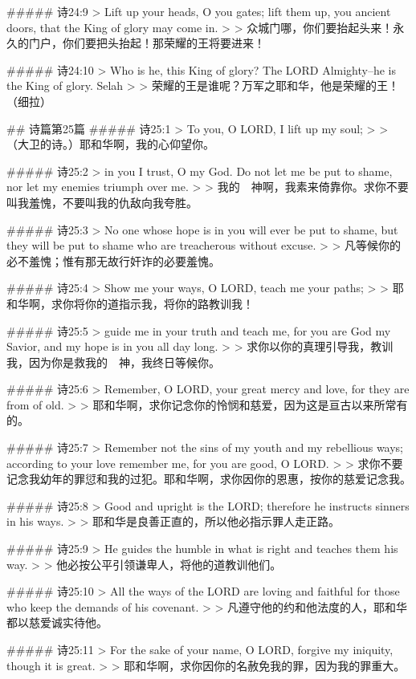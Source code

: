 ##### 诗24:9
> Lift up your heads, O you gates; lift them up, you ancient doors, that the King of glory may come in.
>
> 众城门哪，你们要抬起头来！永久的门户，你们要把头抬起！那荣耀的王将要进来！


##### 诗24:10
> Who is he, this King of glory? The LORD Almighty--he is the King of glory. Selah
>
> 荣耀的王是谁呢？万军之耶和华，他是荣耀的王！（细拉）


## 诗篇第25篇
##### 诗25:1
> To you, O LORD, I lift up my soul;
>
> （大卫的诗。）耶和华啊，我的心仰望你。


##### 诗25:2
> in you I trust, O my God. Do not let me be put to shame, nor let my enemies triumph over me.
>
> 我的　神啊，我素来倚靠你。求你不要叫我羞愧，不要叫我的仇敌向我夸胜。


##### 诗25:3
> No one whose hope is in you will ever be put to shame, but they will be put to shame who are treacherous without excuse.
>
> 凡等候你的必不羞愧；惟有那无故行奸诈的必要羞愧。


##### 诗25:4
> Show me your ways, O LORD, teach me your paths;
>
> 耶和华啊，求你将你的道指示我，将你的路教训我！


##### 诗25:5
> guide me in your truth and teach me, for you are God my Savior, and my hope is in you all day long.
>
> 求你以你的真理引导我，教训我，因为你是救我的　神，我终日等候你。


##### 诗25:6
> Remember, O LORD, your great mercy and love, for they are from of old.
>
> 耶和华啊，求你记念你的怜悯和慈爱，因为这是亘古以来所常有的。


##### 诗25:7
> Remember not the sins of my youth and my rebellious ways; according to your love remember me, for you are good, O LORD.
>
> 求你不要记念我幼年的罪愆和我的过犯。耶和华啊，求你因你的恩惠，按你的慈爱记念我。


##### 诗25:8
> Good and upright is the LORD; therefore he instructs sinners in his ways.
>
> 耶和华是良善正直的，所以他必指示罪人走正路。


##### 诗25:9
> He guides the humble in what is right and teaches them his way.
>
> 他必按公平引领谦卑人，将他的道教训他们。


##### 诗25:10
> All the ways of the LORD are loving and faithful for those who keep the demands of his covenant.
>
> 凡遵守他的约和他法度的人，耶和华都以慈爱诚实待他。


##### 诗25:11
> For the sake of your name, O LORD, forgive my iniquity, though it is great.
>
> 耶和华啊，求你因你的名赦免我的罪，因为我的罪重大。


